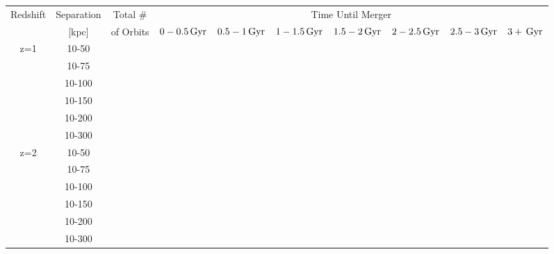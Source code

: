 \begin{table*}[]
\centering
\begin{tabular}{c|c|c|c|c|c|c|c|c|c}
\hline \hline
\multirow{2}{*}{Redshift} & Separation & Total \# & \multicolumn{7}{c}{Time Until Merger} \\ \cline{4-10}
 & [kpc] &  of Orbits & $0-0.5\,\mathrm{Gyr}$ & $0.5-1\,\mathrm{Gyr}$ & $1-1.5\,\mathrm{Gyr}$ & $1.5-2\,\mathrm{Gyr}$ & $2-2.5\,\mathrm{Gyr}$ & $2.5-3\,\mathrm{Gyr}$ & $3+\,\mathrm{Gyr}$  \\ \hline
\multirow{6}{*}{z=1} & 10-50 &  &  &  &  &  &  &  &  \\
 & 10-75 &  &  &  &  &  &  &  &  \\
 & 10-100 &  &  &  &  &  &  &  &  \\
 & 10-150 &  &  &  &  &  &  &  & \\
 & 10-200 &  &  &  &  &  &  &  & \\
 & 10-300 &  &  &  &  &  &  &  & \\  \hline 
 \multirow{6}{*}{z=2} & 10-50 &  &  &  &  &  &  &  &  \\
 & 10-75 &  &  &  &  &  &  &  &  \\
 & 10-100 &  &  &  &  &  &  &  &  \\
 & 10-150 &  &  &  &  &  &  &  & \\
 & 10-200 &  &  &  &  &  &  &  & \\
 & 10-300 &  &  &  &  &  &  &  & \\ 
 \hline \hline
\end{tabular}
\end{table*}